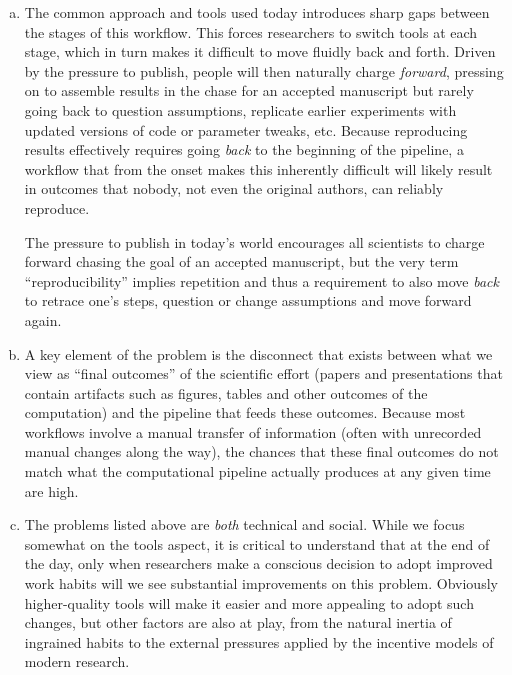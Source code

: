 \documentclass[ChapterTOCs,krantz2]{krantz} %
\theoremstyle{definition}
\begin{document}
\begin{enumerate}[(a)]

\item The common approach and tools used today introduces sharp gaps between
  the stages of this workflow.  This forces researchers to switch tools at each
  stage, which in turn makes it difficult to move fluidly back and forth.
  Driven by the pressure to publish, people will then naturally charge
  \emph{forward}, pressing on to assemble results in the chase for an accepted
  manuscript but rarely going back to question assumptions, replicate earlier
  experiments with updated versions of code or parameter tweaks, etc.  Because
  reproducing results effectively requires going \emph{back} to the
  beginning of the pipeline, a workflow that from the onset makes this
  inherently difficult will likely result in outcomes that nobody, not even the
  original authors, can reliably reproduce.

  The pressure to publish in today's world encourages all scientists to charge
  forward chasing the goal of an accepted manuscript, but the very term
  ``reproducibility'' implies repetition and thus a requirement to also move
  \emph{back} to retrace one's steps, question or change assumptions and move
  forward again.

\item A key element of the problem is the disconnect that exists between what
  we view as ``final outcomes'' of the scientific effort (papers and
  presentations that contain artifacts such as figures, tables and other
  outcomes of the computation) and the pipeline that feeds these outcomes.
  Because most workflows involve a manual transfer of information (often with
  unrecorded manual changes along the way), the chances that these final
  outcomes do not match what the computational pipeline actually produces at any
  given time are high.

\item The problems listed above are \emph{both} technical and social.  While we
  focus somewhat on the tools aspect, it is critical to understand that at the
  end of the day, only when researchers make a conscious decision to adopt
  improved work habits will we see substantial improvements on this problem.
  Obviously higher-quality tools will make it easier and more appealing to
  adopt such changes, but other factors are also at play, from the natural
  inertia of ingrained habits to the external pressures applied by the
  incentive models of modern research.
\end{enumerate}
\end{document}
